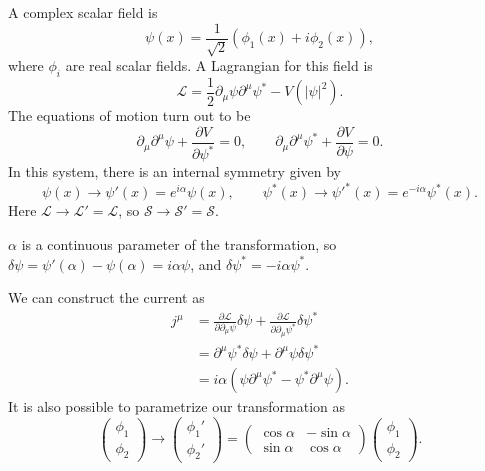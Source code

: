 \documentclass[12pt]{article}
\begin{document}

\begin{exbox}
	A complex scalar field is
	\[
	\psi(x) = \frac{1}{\sqrt 2} (\phi_1(x) + i \phi_2(x)),
	\]
	where $\phi_i$ are real scalar fields. A Lagrangian for this field is
	\[
	\mathcal{L} = \frac{1}{2} \partial_\mu \psi \partial^\mu \psi^\ast - V(|\psi|^2).
	\]
	The equations of motion turn out to be
	\[
	\partial_\mu \partial^\mu \psi + \frac{\partial V}{\partial \psi^\ast} = 0, \qquad \partial_\mu \partial^\mu \psi^\ast + \frac{\partial V}{\partial \psi} = 0.
	\]
	In this system, there is an internal symmetry given by
	\[
	\psi(x) \to \psi'(x) = e^{i \alpha} \psi(x), \qquad \psi^\ast (x) \to \psi'^\ast (x) = e^{-i\alpha} \psi^\ast(x).
	\]
	Here $\mathcal{L} \to \mathcal{L}' = \mathcal{L}$, so $\mathcal{S} \to \mathcal{S}' = \mathcal{S}$.

	$\alpha$ is a continuous parameter of the transformation, so $\delta \psi = \psi'(\alpha) - \psi(\alpha) = i \alpha \psi$, and $\delta \psi^\ast = -i\alpha \psi^\ast$.

	We can construct the current as
	\begin{align*}
		j^\mu &= \frac{\partial \mathcal{L}}{\partial \partial_\mu \psi} \delta \psi + \frac{\partial \mathcal{L}}{\partial \partial_\mu \psi^\ast} \delta \psi^\ast \\
		      &= \partial^\mu \psi^\ast \delta \psi + \partial^\mu \psi \delta \psi^\ast \\
		      &= i \alpha(\psi \partial^\mu \psi^\ast - \psi^\ast \partial^\mu \psi).
	\end{align*}
	It is also possible to parametrize our transformation as
	\[
	\begin{pmatrix}
		\phi_1 \\ \phi_2
	\end{pmatrix}
	\to
	\begin{pmatrix}
		\phi_1' \\ \phi_2'
	\end{pmatrix} =
	\begin{pmatrix}
		\cos \alpha & -\sin\alpha \\ \sin \alpha & \cos \alpha
	\end{pmatrix}
	\begin{pmatrix}
		\phi_1 \\ \phi_2
	\end{pmatrix}.
	\]
\end{exbox}

\newpage
\end{document}
